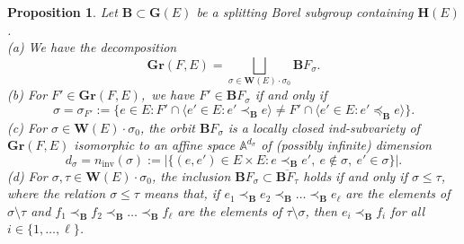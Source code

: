 \documentclass[12pt]{amsart}
\newtheorem{proposition}{Proposition}
\theoremstyle{definition}
\begin{document}
\begin{proposition}
\label{proposition-4-new}
Let $\mathbf{B}\subset\mathbf{G}(E)$ be a splitting Borel subgroup containing $\mathbf{H}(E)$. \\
{\rm (a)}
We have the decomposition
\[\mathbf{Gr}(F,E)=\bigsqcup_{\sigma\in\mathbf{W}(E)\cdot\sigma_0}\mathbf{B}F_\sigma.\]
{\rm (b)} For $F'\in\mathbf{Gr}(F,E)$,\ we have $F'\in\mathbf{B}F_\sigma$ if and only if \[\sigma=\sigma_{F'}:=\{e\in E:F'\cap\langle e'\in E:e'\prec_\mathbf{B}e\rangle\not= F'\cap\langle e'\in E:e'\preceq_\mathbf{B}e\rangle\}.\]
{\rm (c)} For $\sigma\in\mathbf{W}(E)\cdot\sigma_0$, the orbit $\mathbf{B}F_\sigma$ is a locally closed ind-subvariety of $\mathbf{Gr}(F,E)$ isomorphic to an affine space $\mathbb{A}^{d_\sigma}$ of (possibly infinite) dimension
\[d_\sigma=n_\mathrm{inv}(\sigma):=|\{(e,e')\in E\times E:e\prec_\mathbf{B}e',\ e\notin\sigma,\ e'\in\sigma\}|.\]
{\rm (d)} For $\sigma,\tau\in\mathbf{W}(E)\cdot\sigma_0$, the inclusion $\mathbf{B}F_\sigma\subset\overline{\mathbf{B}F_\tau}$ holds if and only if $\sigma\leq\tau$, where the relation $\sigma\leq\tau$ means that,
if $e_1\prec_\mathbf{B}e_2\prec_\mathbf{B}\ldots\prec_\mathbf{B}e_\ell$ are the elements of $\sigma\setminus\tau$ and $f_1\prec_\mathbf{B}f_2\prec_\mathbf{B}\ldots\prec_\mathbf{B}f_\ell$ are the elements of $\tau\setminus\sigma$, then
$e_i\prec_\mathbf{B}f_i$ for all $i\in\{1,\ldots,\ell\}$.
\end{proposition}
\end{document}
